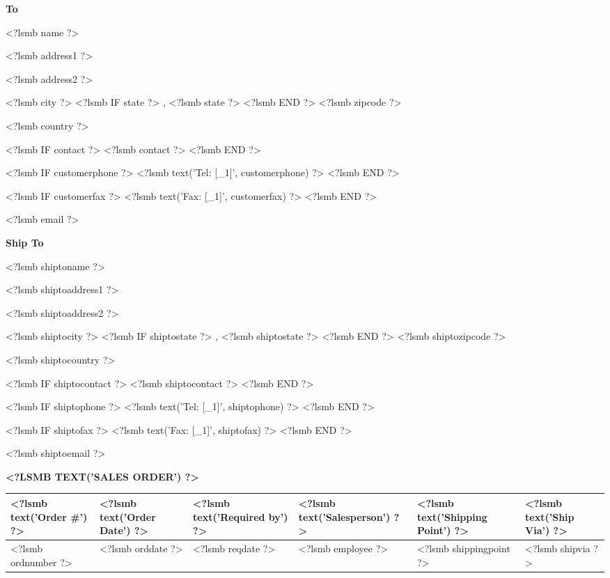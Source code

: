 \parbox[t]{.5\textwidth}{
\textbf{To}
\vspace{0.3cm}

<?lsmb name ?>

<?lsmb address1 ?>

<?lsmb address2 ?>

<?lsmb city ?>
<?lsmb IF state ?>
\hspace{-0.1cm}, <?lsmb state ?>
<?lsmb END ?>
<?lsmb zipcode ?>

<?lsmb country ?>

\vspace{0.3cm}

<?lsmb IF contact ?>
<?lsmb contact ?>
\vspace{0.2cm}
<?lsmb END ?>

<?lsmb IF customerphone ?>
<?lsmb text('Tel: [_1]', customerphone) ?>
<?lsmb END ?>

<?lsmb IF customerfax ?>
<?lsmb text('Fax: [_1]', customerfax) ?>
<?lsmb END ?>

<?lsmb email ?>
}
\parbox[t]{.5\textwidth}{
\textbf{Ship To}
\vspace{0.3cm}

<?lsmb shiptoname ?>

<?lsmb shiptoaddress1 ?>

<?lsmb shiptoaddress2 ?>

<?lsmb shiptocity ?>
<?lsmb IF shiptostate ?>
\hspace{-0.1cm}, <?lsmb shiptostate ?>
<?lsmb END ?>
<?lsmb shiptozipcode ?>

<?lsmb shiptocountry ?>

\vspace{0.3cm}

<?lsmb IF shiptocontact ?>
<?lsmb shiptocontact ?>
\vspace{0.2cm}
<?lsmb END ?>

<?lsmb IF shiptophone ?>
<?lsmb text('Tel: [_1]', shiptophone) ?>
<?lsmb END ?>

<?lsmb IF shiptofax ?>
<?lsmb text('Fax: [_1]', shiptofax) ?>
<?lsmb END ?>

<?lsmb shiptoemail ?>
}
\hfill

\vspace{1cm}

\textbf{\MakeUppercase{<?lsmb text('Sales Order') ?>}}
\hfill

\vspace{1cm}

\begin{tabularx}{\textwidth}{*{6}{|X}|} \hline
  \textbf{<?lsmb text('Order #') ?>} & \textbf{<?lsmb text('Order Date') ?>}
  & \textbf{<?lsmb text('Required by') ?>}
  & \textbf{<?lsmb text('Salesperson') ?>}
  & \textbf{<?lsmb text('Shipping Point') ?>}
  & \textbf{<?lsmb text('Ship Via') ?>} \\ [0.5em]
  \hline
  <?lsmb ordnumber ?> & <?lsmb orddate ?> & <?lsmb reqdate ?> & <?lsmb employee ?> & <?lsmb shippingpoint ?> & <?lsmb shipvia ?> \\
  \hline
\end{tabularx}


